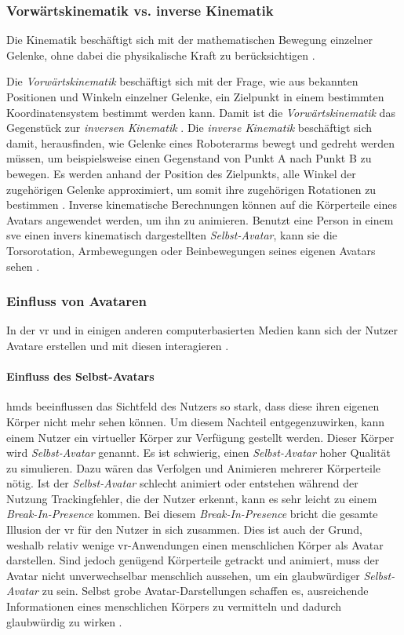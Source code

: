 \documentclass[a4paper,11pt]{article}%
\renewcommand{\\}{\vspace*{0.5\baselineskip} \newline}
\begin{document}
\subsubsection{Vorwärtskinematik vs. inverse Kinematik}
Die Kinematik beschäftigt sich mit der mathematischen Bewegung einzelner Gelenke, ohne dabei die physikalische Kraft zu berücksichtigen \citep[S. 1]{beggs1983kinematics}.

Die \textit{Vorwärtskinematik} beschäftigt sich mit der Frage, wie aus bekannten Positionen und Winkeln einzelner Gelenke, ein Zielpunkt in einem bestimmten Koordinatensystem bestimmt werden kann. Damit ist die \textit{Vorwärtskinematik} das Gegenstück zur \textit{inversen Kinematik} \citep[S. 119]{kucuk2006robot}.
\label{inverseKinematik}
Die \textit{inverse Kinematik} beschäftigt sich damit, herausfinden, wie Gelenke eines Roboterarms bewegt und gedreht werden müssen, um beispielsweise einen Gegenstand von Punkt A nach Punkt B zu bewegen. Es werden anhand der Position des Zielpunkts, alle Winkel der zugehörigen Gelenke approximiert, um somit ihre zugehörigen Rotationen zu bestimmen \citep[S. 299-300]{d2001learning}. Inverse kinematische Berechnungen können auf die Körperteile eines Avatars angewendet werden, um ihn zu animieren. Benutzt eine Person in einem \ac{sve} einen invers kinematisch dargestellten \textit{Selbst-Avatar}, kann sie die Torsorotation, Armbewegungen oder Beinbewegungen seines eigenen Avatars sehen \citep[S. 1]{kim2018real}.

\subsubsection{Einfluss von Avataren}
In der \ac{vr} und in einigen anderen computerbasierten Medien kann sich der Nutzer Avatare erstellen und mit diesen interagieren \citep[S. 1]{neustaedter2009presenting}.

\paragraph{Einfluss des Selbst-Avatars}
\ac{hmd}s beeinflussen das Sichtfeld des Nutzers so stark, dass diese ihren eigenen Körper nicht mehr sehen können. Um diesem Nachteil entgegenzuwirken, kann einem Nutzer ein virtueller Körper zur Verfügung gestellt werden. Dieser Körper wird \textit{Selbst-Avatar} genannt.
Es ist schwierig, einen \textit{Selbst-Avatar} hoher Qualität zu simulieren. Dazu wären das Verfolgen und Animieren mehrerer Körperteile nötig. Ist der \textit{Selbst-Avatar} schlecht animiert oder entstehen während der Nutzung Trackingfehler, die der Nutzer erkennt, kann es sehr leicht zu einem \textit{Break-In-Presence} kommen. Bei diesem \textit{Break-In-Presence} bricht die gesamte Illusion der \ac{vr} für den Nutzer in sich zusammen. 
Dies ist auch der Grund, weshalb relativ wenige \ac{vr}-Anwendungen einen menschlichen Körper als Avatar darstellen.
Sind jedoch genügend Körperteile getrackt und animiert, muss der Avatar nicht unverwechselbar menschlich aussehen, um ein glaubwürdiger \textit{Selbst-Avatar} zu sein. Selbst grobe Avatar-Darstellungen schaffen es, ausreichende Informationen eines menschlichen Körpers zu vermitteln und dadurch glaubwürdig zu wirken \citep{lok2003effects}.
\end{document}
